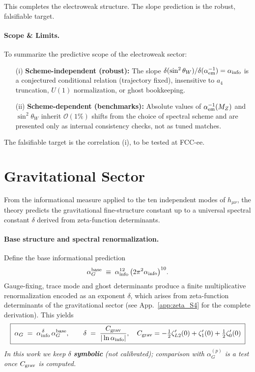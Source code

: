 \documentclass{article}
\numberwithin{equation}{section}
\theoremstyle{plain}
\theoremstyle{definition}
\theoremstyle{remark}
\begin{document}
This completes the electroweak structure. The slope prediction is the robust, falsifiable target.

\paragraph{Scope \& Limits.}
To summarize the predictive scope of the electroweak sector:
\begin{itemize}
\item[(i)] \textbf{Scheme-independent (robust):} The slope $\delta(\sin^2\theta_W)/\delta(\alpha_{\rm em}^{-1})=\alpha_{\rm info}$ is a conjectured conditional relation (trajectory fixed), insensitive to $a_4$ truncation, $U(1)$ normalization, or ghost bookkeeping.
\item[(ii)] \textbf{Scheme-dependent (benchmarks):} Absolute values of $\alpha_{\rm em}^{-1}(M_Z)$ and $\sin^2\theta_W$ inherit $\mathcal{O}(1\%)$ shifts from the choice of spectral scheme and are presented only as internal consistency checks, not as tuned matches.
\end{itemize}
The falsifiable target is the correlation (i), to be tested at FCC-ee.

\section{Gravitational Sector}
\label{sec:grav}

From the informational measure applied to the ten independent modes of $h_{\mu\nu}$, the theory predicts the gravitational fine-structure constant up to a universal spectral constant $\delta$ derived from zeta-function determinants.

\paragraph{Base structure and spectral renormalization.}
Define the base informational prediction
\begin{equation}
\alpha_G^{\rm base} \;\equiv\; \alpha_{\rm info}^{12}\,\big(2\pi^2 \alpha_{\rm info}\big)^{10}.
\label{eq:alphaG_base}
\end{equation}
Gauge-fixing, trace mode and ghost determinants produce a finite multiplicative renormalization encoded as an exponent $\delta$, which arises from zeta-function determinants of the gravitational sector (see App.~\ref{app:zeta_S4} for the complete derivation). This yields
\begin{equation}
\boxed{\;
\alpha_G \;=\; \alpha_{\rm info}^{\,\delta}\,\alpha_G^{\rm base},
\qquad
\delta \;=\; \frac{C_{\rm grav}}{|\ln \alpha_{\rm info}|},
\quad
C_{\rm grav} = -\tfrac{1}{2}\zeta'_{L2}(0) + \zeta'_1(0) + \tfrac{1}{2}\zeta'_0(0)
\;}
\label{eq:alphaG_spectral}
\end{equation}
\noindent\emph{In this work we keep $\delta$ \textbf{symbolic} (not calibrated); comparison with $\alpha_G^{(p)}$ is a test once $C_{\rm grav}$ is computed.}
\end{document}
